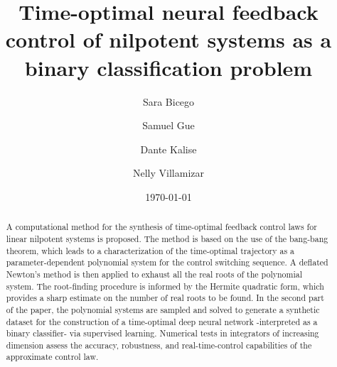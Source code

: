 \documentclass[11pt]{amsart}
\theoremstyle{definition}
\theoremstyle{remark}
\numberwithin{equation}{section}
\begin{document}
\title[Time-optimal neural feedback control as binary classification]{Time-optimal neural feedback control of nilpotent systems as a binary classification problem}
\author[Bicego]{Sara Bicego}
\author[Gue]{Samuel Gue}
\author[Kalise]{Dante Kalise}
\author[Villamizar]{Nelly Villamizar}
\address[Bicego, Kalise]{Department of Mathematics, Imperial College London, United Kingdom}
\address[Gue, Villamizar]{Department of Mathematics, Swansea University, United Kingdom}
\date{\today}

\begin{abstract}
A computational method for the synthesis of time-optimal feedback control laws for linear nilpotent systems is proposed. The method is based on the use of the bang-bang theorem, which leads to a characterization of the time-optimal trajectory as a parameter-dependent polynomial system for the control switching sequence. A deflated Newton’s method is then applied to exhaust all the real roots of the polynomial system. The root-finding procedure is informed by the Hermite quadratic form, which provides a sharp estimate on the number of real roots to be found. In the second part of the paper, the polynomial systems are sampled and solved to generate a synthetic dataset for the construction of a time-optimal deep neural network -interpreted as a binary classifier- via supervised learning. Numerical tests in integrators of increasing dimension assess the accuracy, robustness, and real-time-control capabilities of the approximate control law.
\end{abstract}
\maketitle
\end{document}
